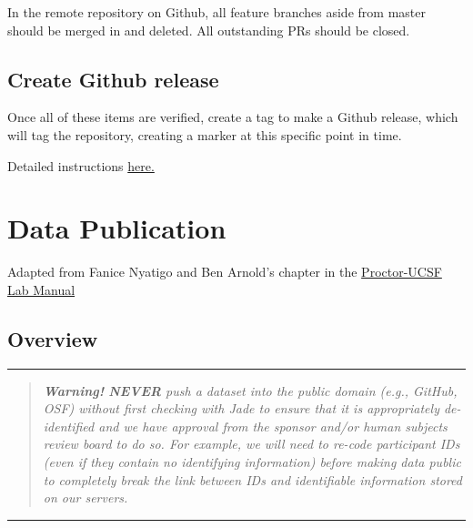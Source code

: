 \documentclass[
]{book}
\begin{document}
In the remote repository on Github, all feature branches aside from master should be merged in and deleted. All outstanding PRs should be closed.

\section{Create Github release}\label{create-github-release}

Once all of these items are verified, create a tag to make a Github release, which will tag the repository, creating a marker at this specific point in time.

Detailed instructions \href{https://docs.github.com/en/enterprise/2.13/user/articles/creating-releases}{here.}

\chapter{Data Publication}\label{data-publication}

Adapted from Fanice Nyatigo and Ben Arnold's chapter in the \href{https://urlisolation.com/browser?clickId=524DE241-3F8F-4C98-B619-3C278374BF64&traceToken=1728923499\%3Bucsfmed_hosted\%3Bhttps\%3A\%2F\%2Fproctor-ucsf.github.io\%2Fd&url=https\%3A\%2F\%2Fproctor-ucsf.github.io\%2Fdcc-handbook\%2Fpublicdata.html}{Proctor-UCSF Lab Manual}

\section{Overview}\label{overview}

\begin{center}\rule{0.5\linewidth}{0.5pt}\end{center}

\begin{quote}
\emph{\textbf{Warning! } \textbf{NEVER} push a dataset into the public domain (e.g., GitHub, OSF) without first checking with Jade to ensure that it is appropriately de-identified and we have approval from the sponsor and/or human subjects review board to do so. For example, we will need to re-code participant IDs (even if they contain no identifying information) before making data public to completely break the link between IDs and identifiable information stored on our servers. }
\end{quote}

\begin{center}\rule{0.5\linewidth}{0.5pt}\end{center}
\end{document}
